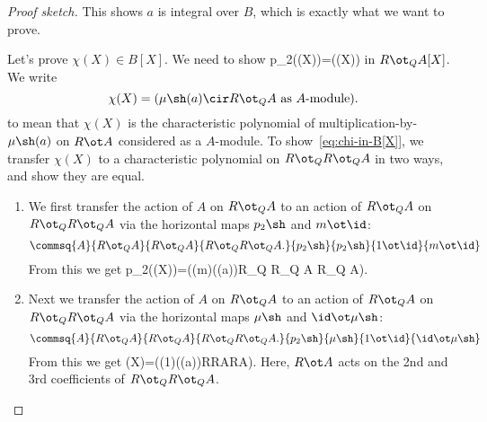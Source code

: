 \begin{proof}[Proof sketch]
This shows $a$ is integral over $B$, which is exactly what we want to prove.

Let's prove $\chi(X)\in B[X]$. We need to show 
p_2\sh(\chi(X))=\mu\sh(\chi(X))
\eeq
in $R\ot_Q A[X]$. We write
\[
\chi(X)=(\mu\sh(a)\cir R\ot_Q A\text{ as $A$-module}). 
\]
to mean that $\chi(X)$ is the characteristic polynomial of multiplication-by-$\mu\sh(a)$ on $R\ot A$ considered as a $A$-module. To show~\eqref{eq:chi-in-B[X]}, we transfer $\chi(X)$ to a characteristic polynomial on $R\ot_QR\ot_Q A$ in two ways, and show they are equal.
\begin{enumerate}
\item
We first transfer the action of $A$ on $R\ot_Q A$ to an action of $R\ot_Q A$ on $R\ot_QR\ot_Q A$ via the horizontal maps $p_2\sh$ and $m\ot \id$:
\[
\commsq{A}{R\ot_QA}{R\ot_Q A}{R\ot_Q R\ot_Q A.}{p_2\sh}{p_2\sh}{1\ot \id}{m\ot \id}
\]
From this we get
p_2\sh(\chi(X))=((m)(\mu\sh(a))\cir R\ot_Q R\ot_Q A R\ot_Q A).
\eeq
\item
Next we transfer the action of $A$ on $R\ot_QA$ to an action of $R\ot_Q A$ on $R\ot_QR\ot_Q A$ via the horizontal maps $\mu\sh$ and $\id \ot \mu\sh$:
\[
\commsq{A}{R\ot_QA}{R\ot_Q A}{R\ot_Q R\ot_Q A.}{p_2\sh}{\mu\sh}{1\ot \id}{\id\ot\mu\sh}
\]
From this we get
\mu\sh\chi(X)=((1\ot \mu\sh)(\mu\sh(a))\cir R\ot R\ot AR\ot A).
\eeq
Here, $R\ot A$ acts on the 2nd and 3rd coefficients of $R\ot_QR\ot_QA$.
\end{enumerate}


\end{proof}
